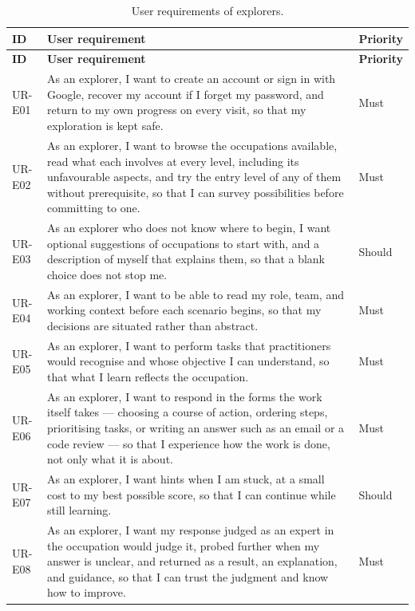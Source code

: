 {\small{}\renewcommand{\arraystretch}{1.1}
\begin{longtable}{|>{\raggedright\arraybackslash}p{}|>{\raggedright\arraybackslash}p{}|>{\raggedright\arraybackslash}p{}|}
\caption{User requirements of explorers.} \\
\hline
\textbf{ID} & \textbf{User requirement} & \textbf{Priority} \\ \hline
\endfirsthead
\hline
\textbf{ID} & \textbf{User requirement} & \textbf{Priority} \\ \hline
\endhead
UR-E01 & As an explorer, I want to create an account or sign in with Google, recover my account if I forget my password, and return to my own progress on every visit, so that my exploration is kept safe. & Must \\ \hline
UR-E02 & As an explorer, I want to browse the occupations available, read what each involves at every level, including its unfavourable aspects, and try the entry level of any of them without prerequisite, so that I can survey possibilities before committing to one. & Must \\ \hline
UR-E03 & As an explorer who does not know where to begin, I want optional suggestions of occupations to start with, and a description of myself that explains them, so that a blank choice does not stop me. & Should \\ \hline
UR-E04 & As an explorer, I want to be able to read my role, team, and working context before each scenario begins, so that my decisions are situated rather than abstract. & Must \\ \hline
UR-E05 & As an explorer, I want to perform tasks that practitioners would recognise and whose objective I can understand, so that what I learn reflects the occupation. & Must \\ \hline
UR-E06 & As an explorer, I want to respond in the forms the work itself takes --- choosing a course of action, ordering steps, prioritising tasks, or writing an answer such as an email or a code review --- so that I experience how the work is done, not only what it is about. & Must \\ \hline
UR-E07 & As an explorer, I want hints when I am stuck, at a small cost to my best possible score, so that I can continue while still learning. & Should \\ \hline
UR-E08 & As an explorer, I want my response judged as an expert in the occupation would judge it, probed further when my answer is unclear, and returned as a result, an explanation, and guidance, so that I can trust the judgment and know how to improve. & Must \\ \hline

\end{longtable}}
